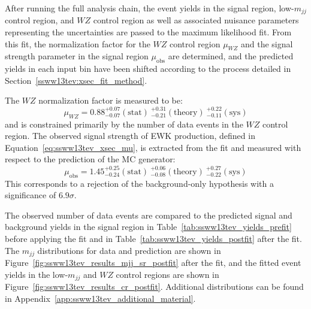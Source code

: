 
After running the full analysis chain, the event yields in the signal region, low-$m_{jj}$ control region, and $WZ$ control region as well as associated nuisance parameters representing the uncertainties are passed to the maximum likelihood fit.
From this fit, the normalization factor for the $WZ$ control region $\mu_{WZ}$ and the signal strength parameter in the signal region $\mu_{\textrm{obs}}$ are determined, and the predicted yields in each input bin have been shifted according to the process detailed in Section~\ref{ssww13tev:xsec_fit_method}.

The $WZ$ normalization factor is measured to be:
\begin{equation}
  \mu_{WZ} = 0.88^{+0.07}_{-0.07}(\textrm{stat})~^{+0.31}_{-0.21}(\textrm{theory})~^{+0.22}_{-0.11}(\textrm{sys})
  \label{eq:ssww13tev_signal_strength_wz}
\end{equation}
and is constrained primarily by the number of data events in the $WZ$ control region.
The observed signal strength of \ssww EWK production, defined in Equation~\ref{eq:ssww13tev_xsec_mu}, is extracted from the fit and measured with respect to the prediction of the  MC generator:
\begin{equation}
  \mu_{\textrm{obs}} = 1.45^{+0.25}_{-0.24}(\textrm{stat})~^{+0.06}_{-0.08}(\textrm{theory})~^{+0.27}_{-0.22}(\textrm{sys}) %
  \label{eq:ssww13tev_signal_strength_sr}
\end{equation}
This corresponds to a rejection of the background-only hypothesis with a significance of $6.9\sigma$.

The observed number of data events are compared to the predicted signal and background yields in the signal region in Table~\ref{tab:ssww13tev_yields_prefit} before applying the fit and in Table~\ref{tab:ssww13tev_yields_postfit} after the fit.
The $m_{jj}$ distributions for data and prediction are shown in Figure~\ref{fig:ssww13tev_results_mjj_sr_postfit} after the fit, and the fitted event yields in the low-$m_{jj}$ and $WZ$ control regions are shown in Figure~\ref{fig:ssww13tev_results_cr_postfit}.
Additional distributions can be found in Appendix~\ref{app:ssww13tev_additional_material}.

